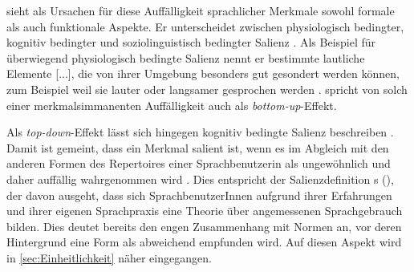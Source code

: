\citet{Auer2014} sieht als Ursachen für diese Auffälligkeit sprachlicher Merkmale sowohl formale als auch funktionale Aspekte.
Er unterscheidet zwischen physiologisch bedingter, kognitiv bedingter und soziolinguistisch bedingter Salienz \citep[s.][9--10]{Auer2014}. 
Als Beispiel für überwiegend physiologisch bedingte Salienz nennt er \glqq bestimmte lautliche Elemente [...], die von ihrer Umgebung besonders gut gesondert werden können, zum Beispiel weil sie lauter oder langsamer gesprochen werden\grqq{} \citep[9]{Auer2014}. 
\citet[38]{Purschke2014} spricht von solch einer merkmalsimmanenten Auffälligkeit auch als \textit{bottom-up}-Effekt. 

Als \textit{top-down}-Effekt lässt sich hingegen kognitiv bedingte Salienz beschreiben \citep[s.][38]{Purschke2014}. 
Damit ist gemeint, dass ein Merkmal salient ist, wenn es im Abgleich mit den anderen Formen des Repertoires einer Sprachbenutzerin als ungewöhnlich und daher auffällig wahrgenommen wird \citep[9--10]{Auer2014}. 
Dies entspricht der Salienzdefinition \citeauthor{Gessinger.2008}s (\citeyear[134]{Gessinger.2008}), der davon ausgeht, dass sich SprachbenutzerInnen aufgrund ihrer Erfahrungen und ihrer eigenen Sprachpraxis eine Theorie über angemessenen Sprachgebrauch bilden. 
Dies deutet bereits den engen Zusammenhang mit Normen an, vor deren Hintergrund eine Form als abweichend empfunden wird. 
Auf diesen Aspekt wird in \autoref{sec:Einheitlichkeit} näher eingegangen.


